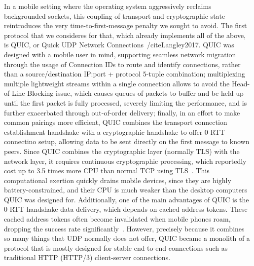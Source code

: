 In a mobile setting where the operating system aggressively reclaims backgrounded sockets, this coupling of transport and cryptographic state reintroduces the very time-to-first-message penalty we sought to avoid.
The first protocol that we consideres for that, which already implements all of the above, is QUIC, or Quick UDP Network Connections~/cite{Langley2017}.
QUIC was designed with a mobile user in mind, supporting seamless network migration through the usage of Connection IDs to route and identify connections, rather than a source/destination IP:port + protocol 5-tuple combination; multiplexing multiple lightweight streams within a single connection allows to avoid the Head-of-Line Blocking issue, which causes queues of packets to buffer and be held up until the first packet is fully processed, severely limiting the performance, and is further exacerbated through out-of-order delivery; finally, in an effort to make common pairings more efficient, QUIC combines the transport connection establishment handshake with a cryptographic handshake to offer 0-RTT connectino setup, allowing data to be sent directly on the first message to known peers.
Since QUIC combines the cryptographic layer (normally TLS) with the network layer, it requires continuous cryptographic processing, which reportedly cost up to 3.5 times more CPU than normal TCP using TLS~\cite{Langley2017}. This computational exertion quickly drains mobile devices, since they are highly battery-constrained, and their CPU is much weaker than the desktop computers QUIC was designed for. Additionally, one of the main advantages of QUIC is the 0-RTT handshake data delivery, which depends on cached address tokens. These cached address tokens often become invalidated when mobile phones roam, dropping the success rate significantly~\cite{Langley2017}.
However, precisely because it combines so many things that UDP normally does not offer, QUIC became a monolith of a protocol that is mostly designed for stable end-to-end connections such as traditional HTTP (HTTP/3) client-server connections. 

